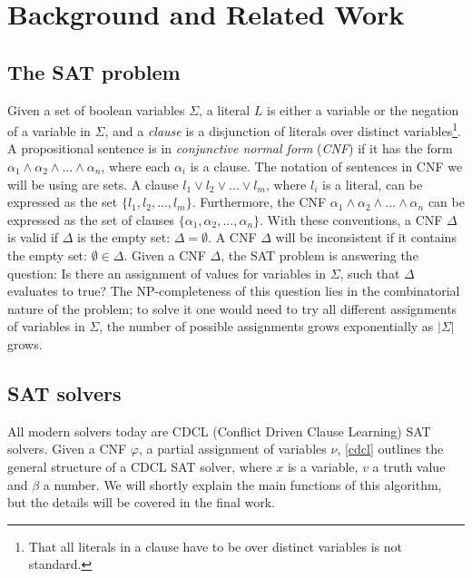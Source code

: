 \documentclass[12pt]{diicc}
\begin{document}
%
% 
\chapter{Background and Related Work}\label{chap:background}

\section{The SAT problem}

Given a set of boolean variables $\Sigma$, a literal $L$ is either a variable or the negation of a variable in $\Sigma$, and a \textit{clause} is a disjunction of literals over distinct variables\footnote[1]{That all literals in a clause have to be over distinct variables is not standard.}. A propositional sentence is in \textit{conjunctive normal form} (\textit{CNF}) if it has the form $\alpha_{1} \wedge \alpha_{2} \wedge ... \wedge \alpha_{n}$, where each $\alpha_{i}$ is a clause. The notation of sentences in CNF we will be using are sets. A clause $l_{1} \vee l_{2} \vee ... \vee l_{m}$, where $l_{i}$ is a literal, can be expressed as the set $\{l_{1},l_{2},...,l_{m}\}$. Furthermore, the CNF $\alpha_{1} \wedge \alpha_{2} \wedge ... \wedge \alpha_{n}$ can be expressed as the set of clauses $\{\alpha_{1},\alpha_{2},...,\alpha_{n}\}$. With these conventions, a CNF $\Delta$ is valid if $\Delta$ is the empty set: $\Delta = \emptyset$. A CNF $\Delta$ will be inconsistent if it contains the empty set: $\emptyset \in \Delta$. 
Given a CNF $\Delta$, the SAT problem is answering the question: Is there an assignment of values for variables in $\Sigma$, such that $\Delta$ evaluates to true? The NP-completeness of this question lies in the combinatorial nature of the problem; to solve it one would need to try all different assignments of variables in $\Sigma$, the number of possible assignments grows exponentially as $|\Sigma|$ grows.

\section{SAT solvers}

All modern solvers today are CDCL (Conflict Driven Clause Learning) \cite{cdcl} SAT solvers. Given a CNF $\varphi$, a partial assignment of variables $\nu$, \ref{cdcl} outlines the general structure of a CDCL SAT solver, where $x$ is a variable, $v$ a truth value and $\beta$ a number. We will shortly explain the main functions of this algorithm, but the details will be covered in the final work.
\end{document}
